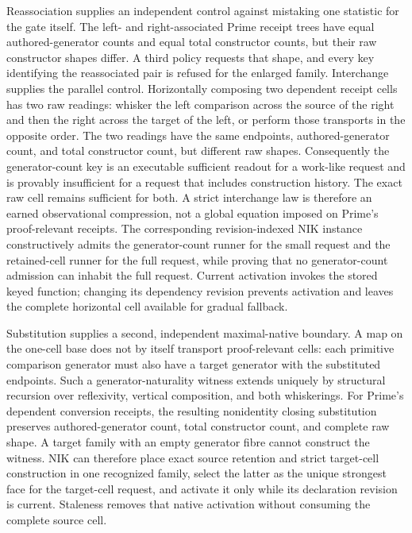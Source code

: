 \documentclass[11pt]{article}
\begin{document}
Reassociation supplies an independent control against mistaking one statistic
for the gate itself.  The left- and right-associated Prime receipt trees have
equal authored-generator counts and equal total constructor counts, but their
raw constructor shapes differ.  A third policy requests that shape, and every
key identifying the reassociated pair is refused for the enlarged family.
Interchange supplies the parallel control.  Horizontally composing two
dependent receipt cells has two raw readings: whisker the left comparison
across the source of the right and then the right across the target of the
left, or perform those transports in the opposite order.  The two readings
have the same endpoints, authored-generator count, and total constructor
count, but different raw shapes.  Consequently the generator-count key is an
executable sufficient readout for a work-like request and is provably
insufficient for a request that includes construction history.  The exact raw
cell remains sufficient for both.  A strict interchange law is therefore an
earned observational compression, not a global equation imposed on Prime's
proof-relevant receipts.
The corresponding revision-indexed NIK instance constructively admits the
generator-count runner for the small request and the retained-cell runner for
the full request, while proving that no generator-count admission can inhabit
the full request.  Current activation invokes the stored keyed function;
changing its dependency revision prevents activation and leaves the complete
horizontal cell available for gradual fallback.

Substitution supplies a second, independent maximal-native boundary.  A map on
the one-cell base does not by itself transport proof-relevant cells: each
primitive comparison generator must also have a target generator with the
substituted endpoints.  Such a generator-naturality witness extends uniquely
by structural recursion over reflexivity, vertical composition, and both
whiskerings.  For Prime's dependent conversion receipts, the resulting
nonidentity closing substitution preserves authored-generator count, total
constructor count, and complete raw shape.  A target family with an empty
generator fibre cannot construct the witness.  NIK can therefore place exact
source retention and strict target-cell construction in one recognized family,
select the latter as the unique strongest face for the target-cell request,
and activate it only while its declaration revision is current.  Staleness
removes that native activation without consuming the complete source cell.
\end{document}
